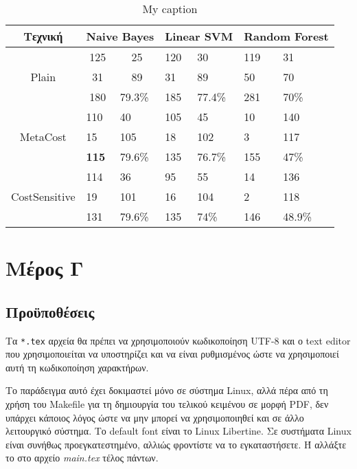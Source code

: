 \begin{table}[]
	\centering
	\caption{My caption}
	\label{tab:cost}
	\begin{tabular}{|c|ll|ll|ll|}
	\hline
	Τεχνική & \multicolumn{2}{l|}{Naive Bayes} & \multicolumn{2}{l|}{Linear SVM} & \multicolumn{2}{l|}{Random Forest} \\ \hline
	\multirow{3}{*}{Plain} & \multicolumn{1}{c}{125} & \multicolumn{1}{c|}{25} & 120 & 30 & 119 & 31 \\
	& \multicolumn{1}{c}{31}  & \multicolumn{1}{c|}{89} & 31  & 89 & 50 & 70 \\ \cline{2-7} 
	& \multicolumn{1}{c}{180} & 79.3\% & 185 & 77.4\%   & 281 & 70\% \\ \hline
	\multirow{3}{*}{MetaCost} & 110    & 40  & 105      & 45  & 10 & 140 \\
						  	  & 15     & 105 & 18       & 102 & 3  & 117              \\ \cline{2-7} 
	& \textbf{115}            & 79.6\% & 135 & 76.7\%   & 155 & 47\%        \\ \hline
	\multirow{3}{*}{CostSensitive} & 114                     & 36                      & 95             & 55             & 14              & 136              \\
	& 19                      & 101                     & 16             & 104            & 2               & 118              \\ \cline{2-7} 
	& 131                     & 79.6\%                    & 135            & 74\%           & 146             & 48.9\%             \\ \hline
\end{tabular}
\end{table}

\section{Μέρος Γ}


\subsection{Προϋποθέσεις}

Τα \verb|*.tex| αρχεία θα πρέπει να χρησιμοποιούν κωδικοποίηση UTF-8 και
ο text editor που χρησιμοποιείται να υποστηρίζει και να είναι
ρυθμισμένος ώστε να χρησιμοποιεί αυτή τη κωδικοποίηση χαρακτήρων.

Το παράδειγμα αυτό έχει δοκιμαστεί μόνο σε σύστημα Linux, αλλά πέρα από
τη χρήση του Makefile για τη δημιουργία του τελικού κειμένου σε μορφή
PDF, δεν υπάρχει κάποιος λόγος ώστε να μην μπορεί να χρησιμοποιηθεί και
σε άλλο λειτουργικό σύστημα. Το default font είναι το Linux Libertine.
Σε συστήματα Linux είναι συνήθως προεγκατεστημένο, αλλιώς φροντίστε να
το εγκαταστήσετε. Ή αλλάξτε το στο αρχείο \emph{main.tex} τέλος πάντων.

